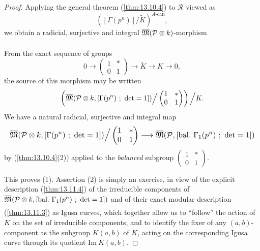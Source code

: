 \begin{proof}
Applying the general theorem (\ref{thm:13.10.4}) to $\mathcal{R}$ viewed as
\[
([\Gamma(p^n)]/\widetilde{K})^{A\text{-}\mathrm{can}} ,
\]
we obtain a radicial, surjective and integral $\overline{\mathfrak{M}}(\mathcal{P} \underset{}{\otimes} k)$-morphism
\begin{center}
\end{center}
From the exact sequence of groups
\[
0 \to \begin{pmatrix} 1 & * \\ 0 & 1 \end{pmatrix} \to \widetilde{K} \to K \to 0 ,
\]
the source of this morphism may be written
\[
\left( \overline{\mathfrak{M}}(\mathcal{P} \underset{}{\otimes} k, [\Gamma(p^n)\ ;\ \det = 1]) \Big/ \begin{pmatrix} 1 & * \\ 0 & 1 \end{pmatrix} \right) \Big/ K .
\]
We have a natural radicial, surjective and integral map
\[
\resizebox{\linewidth}{!}{$\displaystyle
\overline{\mathfrak{M}}(\mathcal{P} \tens{} k, [\Gamma(p^n)\ ;\ \det = 1]) \Big/ \begin{pmatrix} 1 & * \\ 0 & 1 \end{pmatrix} \longrightarrow \overline{\mathfrak{M}}(\mathcal{P}, [\mathrm{bal.\ }\Gamma_1(p^n)\ ;\ \det = 1])
$}
\]
by (\ref{thm:13.10.4}(2)) applied to the \emph{balanced} subgroup $\begin{pmatrix} 1 & * \\ 0 & 1 \end{pmatrix}$.

This proves (1). Assertion (2) is simply an exercise, in view of the explicit description (\ref{thm:13.11.4}) of the irreducible components of $\overline{\mathfrak{M}}(\mathcal{P} \underset{}{\otimes} k, [\mathrm{bal.\ }\Gamma_1(p^n)\ ;\ \det = 1])$ and of their exact modular description (\ref{thm:13.11.3}) as Igusa curves, which together allow us to ``follow'' the action of $K$ on the set of irreducible components, and to identify the fixer of any $(a,b)$-component as the subgroup $K(a,b)$ of $K$, acting on the corresponding Igusa curve through its quotient $\mathrm{Im}\ K(a,b)$.
\end{proof}

